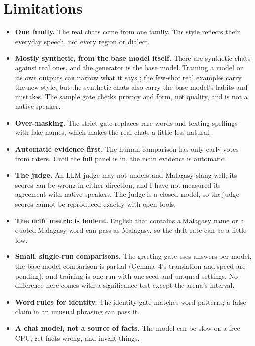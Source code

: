 \documentclass[11pt]{article}
\begin{document}
\section{Limitations}
\label{sec:limitations}
\begin{itemize}
  \item \textbf{One family.} The real chats come from one family. The style reflects their everyday
        speech, not every region or dialect.
  \item \textbf{Mostly synthetic, from the base model itself.} There are \fySynthGateKept{} synthetic
        chats against \fyGateKept{} real ones, and the generator is the base model. Training a model on
        its own outputs can narrow what it says \citep{shumailov2024collapse}; the few-shot real examples
        carry the new style, but the synthetic chats also carry the base model's habits and mistakes. The
        sample gate checks privacy and form, not quality, and is not a native speaker.
  \item \textbf{Over-masking.} The strict gate replaces rare words and texting spellings with fake names,
        which makes the real chats a little less natural.
  \item \textbf{Automatic evidence first.} The human comparison has only early votes from
        \fyArenaRaters{} raters. Until the full panel is in, the main evidence is automatic.
  \item \textbf{The judge.} An LLM judge may not understand Malagasy slang well; its scores can be wrong
        in either direction, and I have not measured its agreement with native speakers. The judge is a
        closed model, so the judge scores cannot be reproduced exactly with open tools.
  \item \textbf{The drift metric is lenient.} English that contains a Malagasy name or a quoted Malagasy
        word can pass as Malagasy, so the drift rate can be a little low.
  \item \textbf{Small, single-run comparisons.} The greeting gate uses \fyGreetAnswers{} answers per model,
        the base-model comparison is partial (Gemma~4's translation and speed are pending), and training is
        one run with one seed and untuned settings. No difference here comes with a significance test
        except the arena's interval.
  \item \textbf{Word rules for identity.} The identity gate matches word patterns; a false claim in an
        unusual phrasing can pass it.
  \item \textbf{A chat model, not a source of facts.} The model can be slow on a free CPU, get facts
        wrong, and invent things.
\end{itemize}
\end{document}
